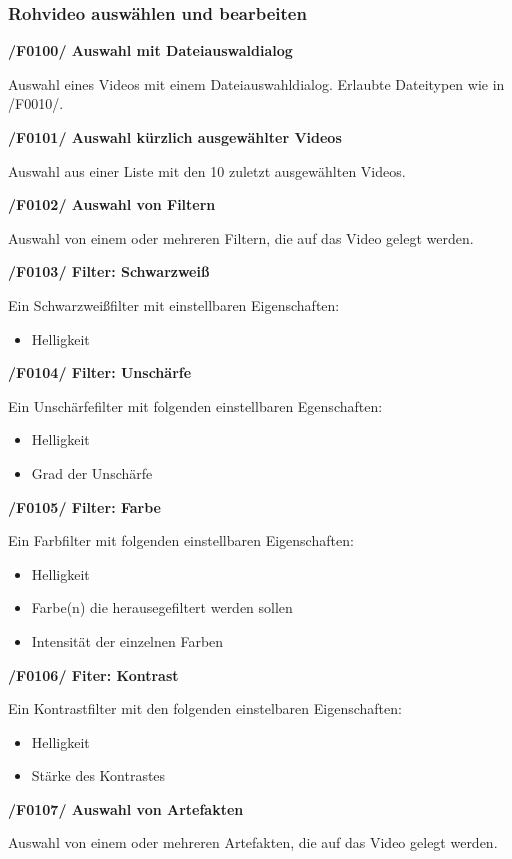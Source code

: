\documentclass[parskip=full]{scrartcl}
\begin{document}
\subsubsection{Rohvideo auswählen und bearbeiten}
\textbf{/F0100/ Auswahl mit Dateiauswaldialog}

Auswahl eines Videos mit einem Dateiauswahldialog. Erlaubte Dateitypen wie in /F0010/.

\textbf{/F0101/ Auswahl kürzlich ausgewählter Videos}

Auswahl aus einer Liste mit den 10 zuletzt ausgewählten Videos.

\textbf{/F0102/ Auswahl von Filtern}

Auswahl von einem oder mehreren Filtern, die auf das Video gelegt werden.

\textbf{/F0103/ Filter: Schwarzweiß}

Ein Schwarzweißfilter mit einstellbaren Eigenschaften:
\begin{itemize}
\item Helligkeit
\end{itemize}
\newpage
\textbf{/F0104/ Filter: Unschärfe}

Ein Unschärfefilter mit folgenden einstellbaren Egenschaften:
\begin{itemize}
\item Helligkeit
\item Grad der Unschärfe
\end{itemize}

\textbf{/F0105/ Filter: Farbe}

Ein Farbfilter mit folgenden einstellbaren Eigenschaften:
\begin{itemize}
\item Helligkeit
\item Farbe(n) die herausegefiltert werden sollen
\item Intensität der einzelnen Farben
\end{itemize}

\textbf{/F0106/ Fiter: Kontrast}

Ein Kontrastfilter mit den folgenden einstelbaren Eigenschaften:
\begin{itemize}
\item Helligkeit
\item Stärke des Kontrastes
\end{itemize}

\textbf{/F0107/ Auswahl von Artefakten}

Auswahl von einem oder mehreren Artefakten, die auf das Video gelegt werden.
\end{document}
